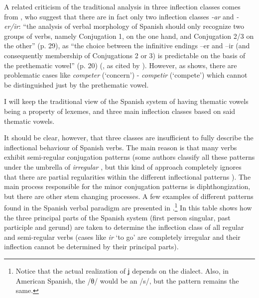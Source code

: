 A related criticism of the traditional analysis in three inflection classes comes from \textcite{Boye.2004}, who suggest that there are in fact only two inflection classes \textit{-ar} and \textit{-er/ir}: ``the analysis of verbal morphology of Spanish should only recognize two groups of verbs, namely Conjugation 1, on the one hand, and Conjugation 2/3 on the other'' (p. 29), as ``the choice between the infinitive endings –er and –ir (and consequently membership of Conjugations 2 or 3) is predictable on the basis of the prethematic vowel'' (p. 20) (\citealt{Boye.Inpreparation}, as cited by \citealt[418]{Roca.2010}). However, as \textcite[418]{Roca.2010} shows, there are problematic cases like \textit{competer} (`concern') - \textit{competir} (`compete') which cannot be distinguished just by the prethematic vowel.

I will keep the traditional view of the Spanish system of having thematic vowels being a property of lexemes, and three main inflection classes based on said thematic vowels.

It should be clear, however, that three classes are insufficient to fully describe the inflectional behaviour of Spanish verbs. The main reason is that many verbs exhibit semi-regular conjugation patterns (some authors classify all these patterns under the umbrella of \textit{irregular} \citealt{Brovetto.2005}, but this kind of approach completely ignores that there are partial regularities within the different inflectional patterns \citealt{Maiden.2001, Maiden.2005}).  
The main process responsible for the minor conjugation patterns is diphthongization, but there are other stem changing processes. A few examples of different patterns found in the Spanish verbal paradigm are presented in .\footnote{Notice that the actual realization of ʝ depends on the dialect. Also, in American Spanish, the /θ/ would be an /s/, but the pattern remains the same.} In this table shows how the three principal parts of the Spanish system (first person singular, past participle and gerund) are taken to determine the inflection class of all regular and semi-regular verbs (cases like \textit{ir} `to go' are completely irregular and their inflection cannot be determined by their principal parts).

